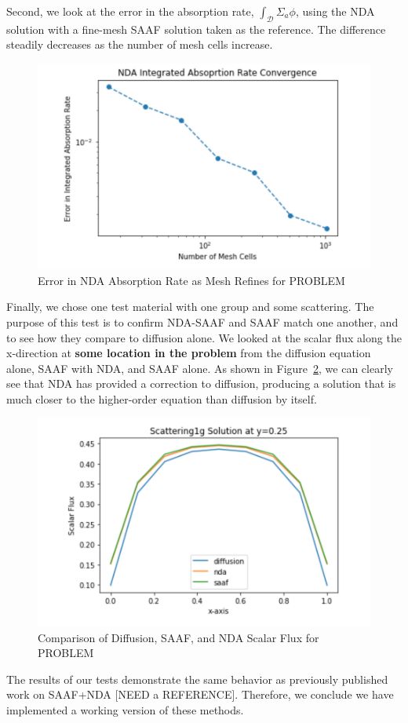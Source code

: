 Second, we look at the error in the absorption rate, $\int_\mathcal{D}\Sigma_a\phi$,
 using the NDA solution with a fine-mesh SAAF solution taken as the reference. The difference steadily decreases as the number of mesh cells increase.
%
\begin{figure}[H]
    \centering
    \includegraphics[width=.75\textwidth]{fig/NDAAbsorptionLogLog.png}
    \caption{Error in NDA Absorption Rate as Mesh Refines for PROBLEM}
    \label{fig:abs_err}
\end{figure}

Finally, we chose one test material with one group and some scattering. The purpose of this test is to confirm NDA-SAAF and SAAF match one another, and to see how they compare to diffusion alone. We looked at the scalar flux along the x-direction at \textbf{some location in the problem} from the diffusion equation alone, SAAF with NDA, and SAAF alone. As shown in Figure~\ref{fig:comparison}, we can clearly see that NDA has provided a correction to diffusion, producing a solution that is much closer to the higher-order equation than diffusion by itself. 
%
\begin{figure}[H]
    \centering
    \includegraphics[width=.75\textwidth]{fig/LineOut25.png}
    \caption{Comparison of Diffusion, SAAF, and NDA Scalar Flux for PROBLEM}
    \label{fig:comparison}
\end{figure}

The results of our tests demonstrate the same behavior as previously published work on SAAF+NDA [NEED a REFERENCE]. Therefore, we conclude we have implemented a working version of these methods. 